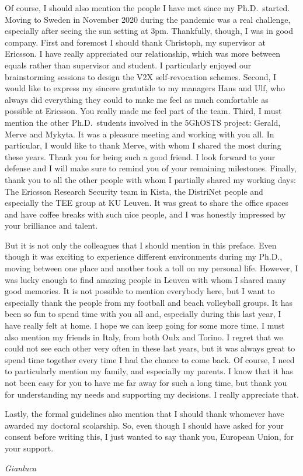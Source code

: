 Of course, I should also mention the people I have met since my Ph.D.\ started.
Moving to Sweden in November 2020 during the pandemic was a real challenge,
especially after seeing the sun setting at 3pm. Thankfully, though, I was in
good company. First and foremost I should thank Christoph, my supervisor at
Ericsson. I have really appreciated our relationship, which was more between
equals rather than supervisor and student. I particularly enjoyed our
brainstorming sessions to design the V2X self-revocation schemes. Second, I
would like to express my sincere gratutide to my managers Hans and Ulf, who
always did everything they could to make me feel as much comfortable as possible
at Ericsson. You really made me feel part of the team. Third, I must mention the
other Ph.D.\ students involved in the 5GhOSTS project: Gerald, Merve and Mykyta.
It was a pleasure meeting and working with you all. In particular, I would like
to thank Merve, with whom I shared the most during these years. Thank you for
being such a good friend. I look forward to your defense and I will make sure to
remind you of your remaining milestones. Finally, thank you to all the other
people with whom I partially shared my working days: The Ericsson Research
Security team in Kista, the DistriNet people and especially the TEE group at KU
Leuven. It was great to share the office spaces and have coffee breaks with such
nice people, and I was honestly impressed by your brilliance and talent.

But it is not only the colleagues that I should mention in this preface. Even
though it was exciting to experience different environments during my Ph.D.,
moving between one place and another took a toll on my personal life. However, I
was lucky enough to find amazing people in Leuven with whom I shared many good
memories. It is not possible to mention everybody here, but I want to especially
thank the people from my football and beach volleyball groups. It has been so
fun to spend time with you all and, especially during this last year, I have
really felt at home. I hope we can keep going for some more time. I must also
mention my friends in Italy, from both Oulx and Torino. I regret that we could
not see each other very often in these last years, but it was always great to
spend time together every time I had the chance to come back. Of course, I need
to particularly mention my family, and especially my parents. I know that it has
not been easy for you to have me far away for such a long time, but thank you
for understanding my needs and supporting my decisions. I really appreciate
that.

Lastly, the formal guidelines also mention that I should thank whomever have
awarded my doctoral scolarship. So, even though I should have asked for your
consent before writing this, I just wanted to say thank you, European Union, for
your support.

\hfill\emph{Gianluca}
